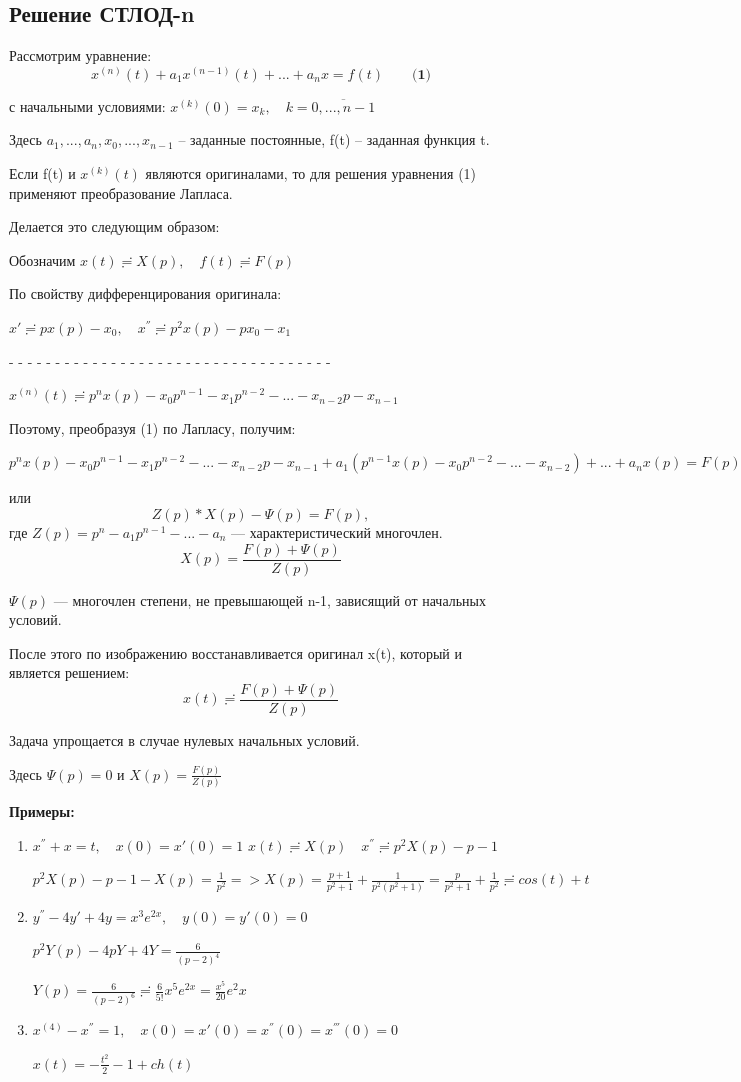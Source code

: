 \documentclass[a4paper, 12pt]{report}
\begin{document}
\subsection{Решение СТЛОД-n}

Рассмотрим уравнение:
$$x^{(n)}(t)+a_1x^{(n-1)}(t)+...+a_n x=f(t)\quad\quad \textbf{(1)}$$

с начальными условиями: $x^{(k)}(0)=x_k,\quad k=\overline{0,...,n-1}$
\par\bigskip
Здесь $a_1,...,a_n, x_0,...,x_{n-1}$ -- заданные постоянные, f(t) -- заданная функция t.

Если f(t) и $x^{(k)}(t)$ являются оригиналами, то для решения уравнения (1) применяют преобразование Лапласа.

Делается это следующим образом:

Обозначим $x(t)\risingdotseq X(p), \quad f(t)\risingdotseq F(p)$

По свойству дифференцирования оригинала:
\quad\bigskip

$x'\risingdotseq px(p)-x_0, \quad x^{''}\risingdotseq p^2x(p)-px_0-x_1$

- - - - - - - - - - - - - - - - - - - - - - - - - - - - - - - - - - - 

$x^{(n)}(t) \risingdotseq p^nx(p)-x_0p^{n-1}-x_1p^{n-2}-...-x_{n-2}p-x_{n-1}$
\quad\bigskip

Поэтому, преобразуя (1) по Лапласу, получим:

$p^nx(p)-x_0p^{n-1}-x_1p^{n-2}-...-x_{n-2}p-x_{n-1}+a_1(p^{n-1}x(p)-x_0p^{n-2}-...-x_{n-2})+...+a_nx(p)=F(p)$

или $$Z(p)*X(p)-\Psi(p)=F(p),$$ где $Z(p)=p^n-a_1p^{n-1}-...-a_n$ --- характеристический многочлен.
$$X(p)=\frac{F(p)+\Psi(p)}{Z(p)}$$

$\Psi(p)$ --- многочлен степени, не превышающей n-1, зависящий от начальных условий.

После этого по изображению восстанавливается оригинал x(t), который и является решением: $$x(t)\risingdotseq \frac{F(p)+\Psi(p)}{Z(p)}$$

Задача упрощается в случае нулевых начальных условий.

Здесь $\Psi(p)=0$ и $X(p)=\frac{F(p)}{Z(p)}$

\par\bigskip
\textbf{Примеры:}
\begin{enumerate}
    \item $x^{''}+x=t, \quad x(0)=x'(0)=1$
    $x(t)\risingdotseq X(p)\quad x^{''}\risingdotseq p^2X(p)-p-1$

$ p^2X(p)-p-1-X(p)=\frac1{p^2}=> X(p)=\frac{p+1}{p^2+1}+\frac1{p^2(p^2+1)}=\frac{p}{p^2+1}+\frac1{p^2}\risingdotseq cos(t)+t$

\item $y^{''}-4y'+4y=x^3e^{2x}, \quad y(0)=y'(0)=0$

$p^2Y(p)-4pY+4Y=\frac{6}{(p-2)^4}$

$Y(p)=\frac{6}{(p-2)^6}\risingdotseq \frac{6}{5!}x^5e^{2x}=\frac{x^5}{20}e^2x$

\item $x^{(4)}-x^{''}=1, \quad x(0)=x'(0)=x^{''}(0)=x^{'''}(0)=0$

$x(t)=-\frac{t^2}{2}-1+ch(t)$
\end{enumerate}
\end{document}
